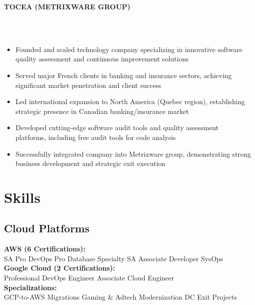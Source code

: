 \documentclass[10pt]{article}
\newcommand{\sectionsep}{\vspace{1.5pt}}
\newcommand{\subsectionsep}{\vspace{0.5pt}}
\newcommand{\runsubsection}[1]{
  \vspace{0.5pt}
  \color{subheadings}\fontsize{10pt}{11.5pt}\selectfont\bfseries\uppercase{#1}\normalfont
}
\newcommand{\descript}[1]{
  \color{subheadings}\fontsize{8pt}{9.5pt}\selectfont{#1}\normalfont\\[0.25pt]
}
\newcommand{\location}[1]{
  \color{headings}\fontsize{7pt}{8.5pt}\selectfont{#1}\normalfont\\[0.25pt]
}
\newenvironment{tightemize}{
\vspace{0pt}
\begin{itemize}[
  label=\textbullet,
  leftmargin=9pt,
  itemsep=0.25pt,
  parsep=0pt,
  topsep=0.25pt,
  partopsep=0pt
]
}{\end{itemize}\vspace{0.25pt}}
\begin{document}
\begin{paracol}{2}
\runsubsection{Tocea (Metrixware Group)}
\descript{| Founder \& CTO}
\location{2010 – 2016 | Rennes, France}
\begin{tightemize}
\item Founded and scaled technology company specializing in innovative software quality assessment and continuous improvement solutions
\item Served major French clients in banking and insurance sectors, achieving significant market penetration and client success
\item Led international expansion to North America (Quebec region), establishing strategic presence in Canadian banking/insurance market
\item Developed cutting-edge software audit tools and quality assessment platforms, including free audit tools for code analysis
\item Successfully integrated company into Metrixware group, demonstrating strong business development and strategic exit execution
\end{tightemize}
\sectionsep


\switchcolumn


\section{Skills}

\subsection{Cloud Platforms}
\subsectionsep
\textbf{AWS (6 Certifications):}\\
SA Pro \textbullet{} DevOps Pro \textbullet{} Database Specialty \textbullet{} SA Associate \textbullet{} Developer \textbullet{} SysOps \\
\subsectionsep
\textbf{Google Cloud (2 Certifications):}\\
Professional DevOps Engineer \textbullet{} Associate Cloud Engineer \\
\subsectionsep
\textbf{Specializations:}\\
GCP-to-AWS Migrations \textbullet{} Gaming \& Adtech Modernization \textbullet{} DC Exit Projects \\
\sectionsep


\end{paracol}
\end{document}
